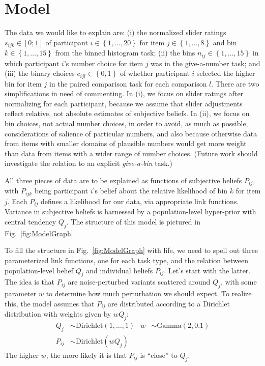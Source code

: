\documentclass[10pt,letterpaper]{article}
\newcommand{\set}[1]{\left\{#1\right\}}
\newcommand{\figref}[1]{Fig.~\ref{#1}}
\begin{document}
\section{Model}

The data we would like to explain are: (i) the normalized slider ratings $s_{ijk} \in [0;1]$ of
participant $i \in \set{1, \dots, 20}$ for item $j \in \set{1, \dots, 8}$ and bin
$k \in \set{1, \dots, 15}$ from the binned histogram task; (ii) the bins
$n_{ij} \in \set{1, \dots, 15}$ in which participant $i$'s number choice for item $j$ was in
the give-a-number task; and (iii) the binary choices $c_{ijl} \in \set{0,1}$ of whether
participant $i$ selected the higher bin for item $j$ in the paired comparison task for each
comparison $l$. There are two simplifications in need of commenting. In (i), we focus on slider
ratings after normalizing for each participant, because we assume that slider adjustments
reflect relative, not absolute estimates of subjective beliefs. In (ii), we focus on bin
choices, not actual number choices, in order to avoid, as much as possible, considerations of
salience of particular numbers, and also because otherwise data from items with smaller domains
of plausible numbers would get more weight than data from items with a wider range of
number choices. (Future work should investigate the relation to an explicit \emph{give-a-bin}
task.)

All three pieces of data are to be explained as functions of subjective beliefs $P_{ij}$, with
$P_{ijk}$ being participant $i$'s belief about the relative likelihood of bin $k$ for item
$j$. Each $P_{ij}$ defines a likelihood for our data, via appropriate link functions. Variance
in subjective beliefs is harnessed by a population-level hyper-prior with central tendency
$Q_{j}$. The structure of this model is pictured in \figref{fig:ModelGraph}.



To fill the structure in \figref{fig:ModelGraph} with life, we need to spell out three
parameterized link functions, one for each task type, and the relation between population-level
belief $Q_j$ and individual beliefs $P_{ij}$. Let's start with the latter. The idea is that
$P_{ij}$ are noise-perturbed variants scattered around $Q_j$, with some parameter $w$ to
determine how much perturbation we should expect.  To realize this, the model assumes that
$P_{ij}$ are distributed according to a Dirichlet distribution with weights given by $w Q_{j}$:
\begin{align*}
  Q_j & \sim \text{Dirichlet}(1, \dots, 1) & w & \sim \text{Gamma}(2,0.1) \\
  P_{ij} & \sim \text{Dirichlet}( w Q_j)
\end{align*}
The higher $w$, the more likely it is that $P_{ij}$ is ``close'' to $Q_j$.
\end{document}
